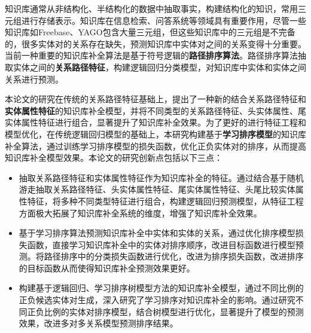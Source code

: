 

\makeatletter





\begin{cabstract}
知识库通常从非结构化、半结构化的数据中抽取事实，构建结构化的知识，常用三元组进行存储表示。知识库在信息检索、问答系统等领域具有重要作用，尽管一些知识库如Freebase、YAGO包含大量三元组，但这些知识库中的三元组是不完备的，很多实体对的关系存在缺失，预测知识库中实体对之间的关系变得十分重要。当前一种重要的知识库补全算法是基于符号逻辑的\textbf{路径排序算法}。路径排序算法抽取实体之间的\textbf{关系路径特征}，构建逻辑回归分类模型，对知识库中实体和实体之间关系进行预测。

本论文的研究在传统的关系路径特征基础上，提出了一种新的结合关系路径特征和\textbf{实体属性特征}的知识库补全模型，并将不同类型的关系路径特征、头实体属性、尾实体属性特征进行组合，显著提升了知识库补全效果。为了更好的进行特征工程和模型优化，在传统逻辑回归模型的基础上，本研究构建基于\textbf{学习排序模型}的知识库补全算法，通过训练学习排序模型的损失函数，优化正负实体对的排序，从而提高知识库补全模型效果。本论文的研究创新点包括以下三点：
\begin{itemize}[$\bullet$]
    \item 抽取关系路径特征和实体属性特征作为知识库补全的特征。通过结合基于随机游走抽取关系路径特征、头实体属性特征、尾实体属性特征、头尾比较实体属性特征，将多种不同类型特征进行组合，构建逻辑回归预测模型，从特征工程方面极大拓展了知识库补全系统的维度，增强了知识库补全效果。
    \item 基于学习排序算法预测知识库补全中实体和实体的关系，通过优化排序模型损失函数，直接学习知识库补全中的实体对排序顺序，改进目标函数进行模型预测。将路径排序中的分类损失函数进行优化，改进为排序损失函数，改进排序的目标函数从而使得知识库补全预测效果更好。
    \item 构建基于逻辑回归、学习排序树模型方法的知识库补全模型，通过不同比例的正负候选实体对生成，深入研究了学习排序对知识库补全的影响。通过研究不同正负比例的实体对排序模型，结合树模型进行优化，显著提升了模型的预测效果，改进多对多关系模型预测排序结果。
\end{itemize}
\end{cabstract}

